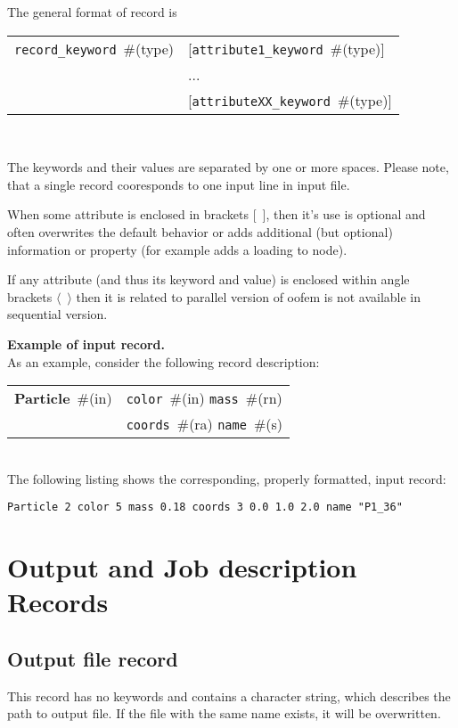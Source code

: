 \documentclass[a4paper]{report}
\newcommand{\param}[1]{\texttt{#1}} %
\newcommand{\optional}[1]{[#1]} %
\newcommand{\field}[2]{\param{#1}~\#{\tiny(#2)}} %
\newcommand{\optField}[2]{\optional{\field{#1}{#2}}}
\newcommand{\entKeywordInstWithVal}[2]{\textbf{#1}~\#{\tiny(#2)}} %
\newcommand{\Pmode}[1]{{\sffamily #1}}
\newenvironment{record}[1][]{\begin{tabular}{|ll}}{\end{tabular}\\}
\newcommand{\recentry}[2]{{#1}&{#2}\\}
\newcounter{rcc}
\newenvironment{record}[1][\textwidth]{\setcounter{rcc}{0}\rowcolors{1}{lightgray}{lightgray}\tabularx{#1}{llR} \hline}
               {\endtabularx}
\newcommand{\recentry}[2]{\ifthenelse{\value{rcc}>0}{$\backslash$ \\}{\setcounter{rcc}{1}}{#1}&{#2}&}
\begin{document}
The general format of record is \\

\noindent
\begin{record}
  \recentry{\field{record\_keyword}{type}}{\optField{attribute1\_keyword}{type}}
  \recentry{}{...}
  \recentry{}{\optField{attributeXX\_keyword}{type}}
\end{record}

The keywords and their values are separated by one or more spaces. Please note, that a single record cooresponds to one input line in input file. 


When some attribute is enclosed in brackets [~], then it's use is optional
and often overwrites the default behavior or adds additional (but
optional) information or property (for example adds a loading to
node).

\Pmode{If any attribute (and thus its keyword and value) is enclosed within angle brackets $\langle$~$\rangle$ then it is related to parallel version of oofem is not available in sequential version.}

{\flushleft \bf Example of input record.}\\
As an example, consider the following record description:\\
\begin{record}
  \recentry{\entKeywordInstWithVal{Particle}{in}}{\field{color}{in} \field{mass}{rn}}
  \recentry{}{\field{coords}{ra} \field{name}{s}}
\end{record}
The following listing shows the corresponding, properly formatted, input record:
\begin{lstlisting}[style=oofem, language=oofeminput, caption={Corresponding input record}, moreemph={color, mass, name}, morekeywords={Particle}]
Particle 2 color 5 mass 0.18 coords 3 0.0 1.0 2.0 name "P1_36"
\end{lstlisting}


\chapter{Output and Job description Records}
\section{Output file record}
\label{_OutputFileRecord}
This record has no keywords and contains a character string, which
describes the path to output file. If the file with the same name exists,
it will be overwritten.
\end{document}
